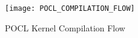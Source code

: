 \begin{figure}[h]
    \centering
    \texttt{[image: POCL\_COMPILATION\_FLOW]}
    \caption{POCL Kernel Compilation Flow}
    \label{fig:5_KCF}
\end{figure}